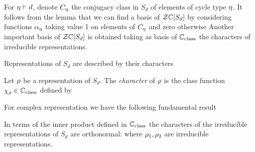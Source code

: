 \documentclass[10pt]{beamer}
\begin{document}
\begin{frame}

\begin{lemma}
\end{lemma}

For $\eta\vdash d$, denote $C_\eta$ the conjugacy class in $S_d$ of elements of cycle type $\eta$. It follows from the lemma that we can find a basis of $\mathcal Z\mathbb C[S_d]$ by considering functions $\alpha_\eta$ taking value 1 on elements of $C_\eta$ and zero otherwise
Another important basis of $\mathcal Z\mathbb C[S_d]$ is obtained taking as basis of $\mathbb C_{\text{class}}$ the characters of irreducible representations. 

\end{frame}

\begin{frame}

Representations of $S_d$ are described by their characters

\begin{definition}
	Let $\rho$ be a representation of $S_d$. The \emph{character} of $\rho$ is the class function $\chi_\rho\in\mathbb C_{\text{class}}$ defined by
	\deq{\c_\r(\s):=\tr(\r(\s))}
\end{definition}

For complex representation we have the following fundamental result
\begin{theorem}
	In terms of the inner product defined in $\mathbb C_{\text{class}}$ the characters of the irreducible representations of $S_d$ are orthonormal:
	where $\rho_1,\rho_2$ are irreducible representations.  
\end{theorem}

\end{frame}
\end{document}
